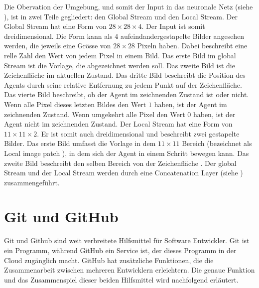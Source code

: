 Die Obervation der Umgebung, und somit der Input in das neuronale Netz (siehe
), ist in zwei Teile gegliedert: den Global Stream und
den Local Stream. Der Global Stream hat eine Form von $28\times28\times4$. Der
Input ist somit dreidimensional. Die Form kann als 4 aufeindandergestapelte
Bilder angesehen werden, die jeweils eine Grösse von $28\times28$ Pixeln haben.
Dabei beschreibt eine relle Zahl den Wert von jedem Pixel in einem Bild. Das
erste Bild im global Stream ist die Vorlage, die abgezeichnet werden soll. Das
zweite Bild ist die Zeichenfläche im aktuellen Zustand. Das dritte Bild
beschreibt die Position des Agents durch seine relative Entfernung zu jedem
Punkt auf der Zeichenfläche. Das vierte Bild beschreibt, ob der Agent im
zeichnenden Zustand ist oder nicht. Wenn alle Pixel dieses letzten Bildes den
Wert $1$ haben, ist der Agent im zeichnenden Zustand. Wenn umgekehrt alle Pixel
den Wert $0$ haben, ist der Agent nicht im zeichnenden Zustand. Der Local Stream
hat eine Form von $11\times11\times2$. Er ist somit auch dreidimensional und
beschreibt zwei gestapelte Bilder. Das erste Bild umfasst die Vorlage in dem
$11\times11$ Bereich (bezeichnet als Local image patch \cite[S.
5]{zhou_learning_2018}), in dem sich der Agent in einem Schritt bewegen kann.
Das zweite Bild beschreibt den selben Bereich von der Zeichenfläche \cite[S. 4
ff.]{zhou_learning_2018}. Der global Stream und der Local Stream werden durch
eine Concatenation Layer (siehe ) zusammengeführt. 

\section{Git und GitHub}\label{chap:t_git} Git und Github sind weit verbreitete
Hilfsmittel für Software Entwickler. Git ist ein Programm, während GitHub ein
Service ist, der dieses Programm in der Cloud zugänglich macht. GitHub hat
zusätzliche Funktionen, die die Zusammenarbeit zwischen mehreren Entwicklern
erleichtern. Die genaue Funktion und das Zusammenspiel dieser beiden Hilfsmittel
wird nachfolgend erläutert.

